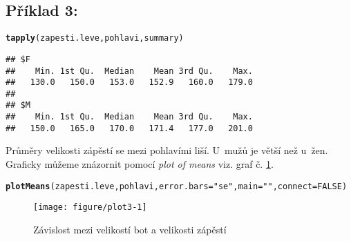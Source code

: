 \documentclass[twoside]{article}\usepackage[]{graphicx}\usepackage[]{color}
\makeatletter
\def\maxwidth{ %
  \ifdim\Gin@nat@width>\linewidth
    \linewidth
  \else
    \Gin@nat@width
  \fi
}
\newcommand{\hlnum}[1]{\textcolor[rgb]{0.686,0.059,0.569}{#1}}%
\newcommand{\hlstr}[1]{\textcolor[rgb]{0.192,0.494,0.8}{#1}}%
\newcommand{\hlstd}[1]{\textcolor[rgb]{0.345,0.345,0.345}{#1}}%
\newcommand{\hlkwc}[1]{\textcolor[rgb]{0.333,0.667,0.333}{#1}}%
\newcommand{\hlkwd}[1]{\textcolor[rgb]{0.737,0.353,0.396}{\textbf{#1}}}%
\newenvironment{kframe}{%
 \def\at@end@of@kframe{}%
 \ifinner\ifhmode%
  \def\at@end@of@kframe{\end{minipage}}%
  \begin{minipage}{\columnwidth}%
 \fi\fi%
 \def\FrameCommand##1{\hskip\@totalleftmargin \hskip-\fboxsep
 \colorbox{shadecolor}{##1}\hskip-\fboxsep
     \hskip-\linewidth \hskip-\@totalleftmargin \hskip\columnwidth}%
 \MakeFramed {\advance\hsize-\width
   \@totalleftmargin\z@ \linewidth\hsize
   \@setminipage}}%
 {\par\unskip\endMakeFramed%
 \at@end@of@kframe}
\newenvironment{knitrout}{}{} %
\makeatother
\begin{document}
\subsection*{Příklad 3:}
\begin{knitrout}
\color{fgcolor}\begin{kframe}
\begin{alltt}
\hlkwd{tapply}\hlstd{(zapesti.leve, pohlavi, summary)}
\end{alltt}
\begin{verbatim}
## $F
##    Min. 1st Qu.  Median    Mean 3rd Qu.    Max. 
##   130.0   150.0   153.0   152.9   160.0   179.0 
## 
## $M
##    Min. 1st Qu.  Median    Mean 3rd Qu.    Max. 
##   150.0   165.0   170.0   171.4   177.0   201.0
\end{verbatim}
\end{kframe}
\end{knitrout}
Průměry velikosti zápěstí se mezi pohlavími liší. U~mužů je větší než u~žen. Graficky můžeme znázornit pomocí \emph{plot of means} viz. graf č. \ref{fig:plot3}.

\begin{knitrout}
\color{fgcolor}\begin{kframe}
\begin{alltt}
\hlkwd{plotMeans}\hlstd{(zapesti.leve, pohlavi,} \hlkwc{error.bars}\hlstd{=}\hlstr{"se"}\hlstd{,} \hlkwc{main}\hlstd{=}\hlstr{""}\hlstd{,} \hlkwc{connect}\hlstd{=}\hlnum{FALSE}\hlstd{)}
\end{alltt}
\end{kframe}\begin{figure}[h]
\texttt{[image: figure/plot3-1]} \caption[Závislost mezi velikostí bot a velikosti zápěstí]{Závislost mezi velikostí bot a velikosti zápěstí}\label{fig:plot3}
\end{figure}


\end{knitrout}


\newpage
\end{document}
